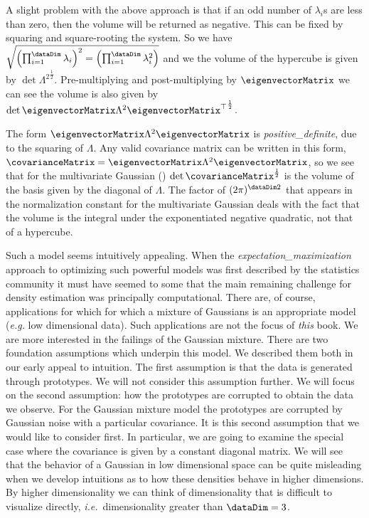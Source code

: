 \begin{boxfloat}
  A slight problem with the above approach is that if an odd number of
  $\lambda_i$s are less than zero, then the volume will be returned as
  negative. This can be fixed by squaring and square-rooting the
  system. So we have $\sqrt{\left(\prod_{i=1}^\dataDim
      \lambda_i\right)^2=\left(\prod_{i=1}^\dataDim
      \lambda_i^2\right)}$ and we the volume of the hypercube is given
  by $\det{\Lambda^2}^{\frac{1}{2}}$.  Pre-multiplying and
  post-multiplying by $\eigenvectorMatrix$ we can see the volume is
  also given by
  $\det{\eigenvectorMatrix\Lambda^2\eigenvectorMatrix^\top}^{\frac{1}{2}}$. 

  The form $\eigenvectorMatrix\Lambda^2\eigenvectorMatrix$ is
  \emph{\gls{positive_definite}}, due
  to the squaring of $\Lambda$. Any valid covariance matrix can be
  written in this form,
  $\covarianceMatrix=\eigenvectorMatrix\Lambda^2\eigenvectorMatrix$,
  so we see that for the multivariate Gaussian ()
  $\det{\covarianceMatrix}^{\frac{1}{2}}$ is the volume of the basis
  given by the diagonal of $\Lambda$. The factor of
  $(2\pi)^{{\dataDim}{2}}$ that appears in the normalization constant
  for the multivariate Gaussian deals with the fact that the volume is
  the integral under the exponentiated negative quadratic, not that of
  a hypercube.
\end{boxfloat}

Such a model seems intuitively appealing. When the
\emph{\gls{expectation_maximization}} approach to optimizing such
powerful models was first described by \cite{Dempster:EM77} the
statistics community it must have seemed to some that the main
remaining challenge for density estimation was principally
computational. There are, of course, applications for which for which
a mixture of Gaussians is an appropriate
model (\emph{e.g.}  low dimensional data). Such applications are not
the focus of \emph{this} book. We are more interested in the failings
of the Gaussian mixture. There are two
foundation assumptions which underpin this model. We described them
both in our early appeal to intuition. The first assumption is that
the data is generated through prototypes. We
will not consider this assumption further. We will focus on the second
assumption: how the prototypes are corrupted to obtain the data we
observe. For the Gaussian mixture model
the prototypes are corrupted by Gaussian noise with a particular
covariance. It is this second assumption that we would like to
consider first. In particular, we are going to examine the special
case where the covariance is given by a constant diagonal matrix. We
will see that the behavior of a Gaussian in low dimensional space can
be quite misleading when we develop intuitions as to how these
densities behave in higher dimensions. By higher dimensionality we can
think of dimensionality that is difficult to visualize directly,
\emph{i.e.}\ dimensionality greater than $\dataDim=3$.

